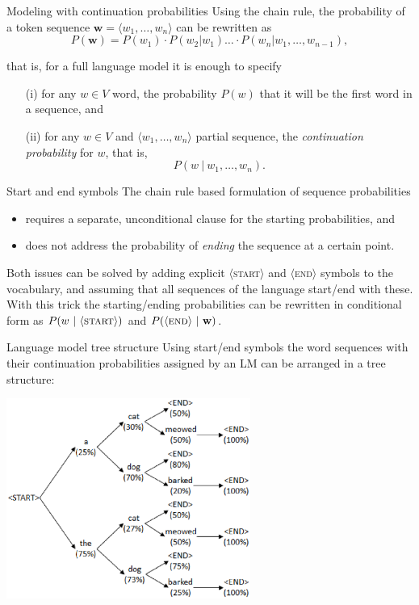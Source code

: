 \documentclass[style=upen, size=14pt]{powerdot}
\theoremstyle{definition}
\begin{document}
\begin{slide}[toc=Continuations]{Modeling with continuation probabilities}
  Using the chain rule, the probability of a token sequence
  $\mathbf{w} = \langle w_1,\dots, w_n\rangle$ can be rewritten as
  $$P(\mathbf w)= P(w_1)\cdot P(w_2 \vert w_1 )\dots \cdot P(w_n\vert w_1,\dots, w_{n-1}),$$
  
  that is, for a full language model it is enough to specify
  \begin{itemize}
  \item[(i)] for any $w\in V$ word, the probability $P(w)$ that it will be the first
    word in a sequence, and
  \item[(ii)] for any $w\in V$
   and $\langle w_1,\dots,w_n\rangle$ partial sequence, the
  \emph{continuation probability} for $w$, that is,
  $$P(w ~\vert ~ w_1,\dots,w_n).$$
  \end{itemize}
\end{slide}


\begin{slide}[toc=Start and end symbols]{Start and end symbols}
  The chain rule based formulation of sequence probabilities
  \begin{itemize}
  \item requires a separate, unconditional clause for the starting probabilities, and 
  \item does not address the probability of \emph{ending} the sequence at a
    certain point.
  \end{itemize}
  Both issues can be solved by adding explicit $\langle$\textsc{start}$\rangle$
  and $\langle$\textsc{end}$\rangle$ symbols to the vocabulary, and assuming
  that all sequences of the language start/end with these. With this trick the
  starting/ending probabilities can be rewritten in conditional form as
  $P(w ~\vert~ \langle\textsc{start}\rangle)$ and
  $P(\langle\textsc{end}\rangle ~\vert~ \mathbf{w})$.
\end{slide}

\begin{slide}[toc=LM tree]{Language model tree structure}
  Using start/end symbols the word sequences with their continuation probabilities
  assigned by an LM can be arranged in a tree structure:
    \begin{center}
    \includegraphics[width=0.6\textwidth]{figures/lm_tree.eps}
  \end{center}
\end{slide}
\end{document}
